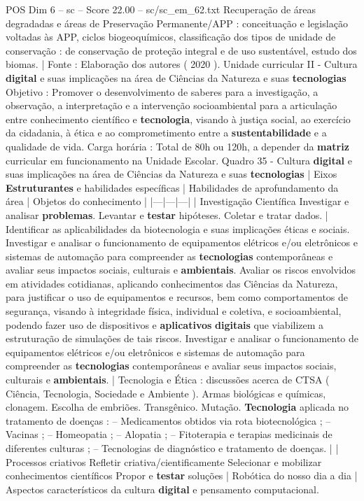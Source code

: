 \begin{textsample}{POS Dim 6 – sc – Score 22.00 – sc/sc\_em\_62.txt}
Recuperação de áreas degradadas e áreas de Preservação Permanente/APP : conceituação e legislação voltadas às APP, ciclos biogeoquímicos, classificação dos tipos de unidade de conservação : de conservação de proteção integral e de uso sustentável, estudo dos biomas. | Fonte : Elaboração dos autores ( 2020 ).
Unidade curricular II - Cultura \textbf{digital} e suas implicações na área de Ciências da Natureza e suas \textbf{tecnologias} Objetivo : Promover o desenvolvimento de saberes para a investigação, a observação, a interpretação e a intervenção socioambiental para a articulação entre conhecimento científico e \textbf{tecnologia}, visando à justiça social, ao exercício da cidadania, à ética e ao comprometimento entre a \textbf{sustentabilidade} e a qualidade de vida.
Carga horária : Total de 80h ou 120h, a depender da \textbf{matriz} curricular em funcionamento na Unidade Escolar.
Quadro 35 - Cultura \textbf{digital} e suas implicações na área de Ciências da Natureza e suas \textbf{tecnologias} | Eixos \textbf{Estruturantes} e habilidades específicas | Habilidades de aprofundamento da área | Objetos do conhecimento | |---|---|---| | Investigação Científica Investigar e analisar \textbf{problemas}.
Levantar e \textbf{testar} hipóteses.
Coletar e tratar dados. | Identificar as aplicabilidades da biotecnologia e suas implicações éticas e sociais.
Investigar e analisar o funcionamento de equipamentos elétricos e/ou eletrônicos e sistemas de automação para compreender as \textbf{tecnologias} contemporâneas e avaliar seus impactos sociais, culturais e \textbf{ambientais}.
Avaliar os riscos envolvidos em atividades cotidianas, aplicando conhecimentos das Ciências da Natureza, para justificar o uso de equipamentos e recursos, bem como comportamentos de segurança, visando à integridade física, individual e coletiva, e socioambiental, podendo fazer uso de dispositivos e \textbf{aplicativos} \textbf{digitais} que viabilizem a estruturação de simulações de tais riscos.
Investigar e analisar o funcionamento de equipamentos elétricos e/ou eletrônicos e sistemas de automação para compreender as \textbf{tecnologias} contemporâneas e avaliar seus impactos sociais, culturais e \textbf{ambientais}. | Tecnologia e Ética : discussões acerca de CTSA ( Ciência, Tecnologia, Sociedade e Ambiente ).
Armas biológicas e químicas, clonagem.
Escolha de embriões.
Transgênico.
Mutação. \textbf{Tecnologia} aplicada no tratamento de doenças : – Medicamentos obtidos via rota biotecnológica ; – Vacinas ; – Homeopatia ; – Alopatia ; – Fitoterapia e terapias medicinais de diferentes culturas ; – Tecnologias de diagnóstico e tratamento de doenças. | | Processos criativos Refletir criativa/cientificamente Selecionar e mobilizar conhecimentos científicos Propor e \textbf{testar} soluções | Robótica do nosso dia a dia | Aspectos característicos da cultura \textbf{digital} e pensamento computacional.

\end{textsample}
